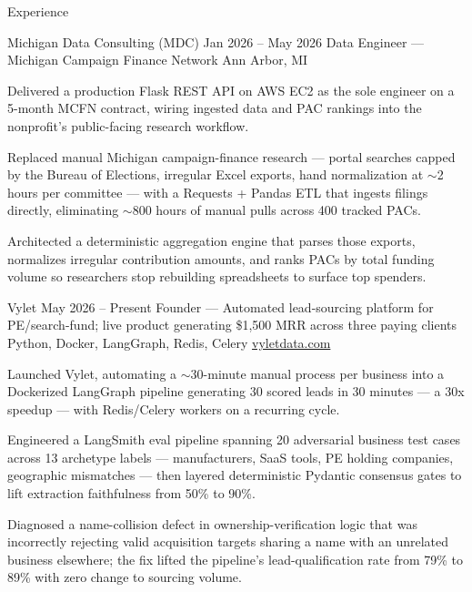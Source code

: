\documentclass[
	11pt
]{../../../template}
\begin{document}
	\begin{rSection}{E}{xperience}
		\begin{rSectionEntry}
			{Michigan Data Consulting (MDC)}
			{Jan 2026 -- May 2026}
			{Data Engineer — Michigan Campaign Finance Network}
			{}
			{Ann Arbor, MI}

			\item Delivered a production Flask REST API on AWS EC2 as the sole engineer on a 5-month MCFN contract, wiring ingested data and PAC rankings into the nonprofit's public-facing research workflow.
			\item Replaced manual Michigan campaign-finance research — portal searches capped by the Bureau of Elections, irregular Excel exports, hand normalization at $\sim$2 hours per committee — with a Requests + Pandas ETL that ingests filings directly, eliminating $\sim$800 hours of manual pulls across 400 tracked PACs.
			\item Architected a deterministic aggregation engine that parses those exports, normalizes irregular contribution amounts, and ranks PACs by total funding volume so researchers stop rebuilding spreadsheets to surface top spenders.
		\end{rSectionEntry}

		\begin{rSectionEntry}
			{Vylet}
			{May 2026 -- Present}
			{Founder --- Automated lead-sourcing platform for PE/search-fund; live product generating \$1,500 MRR across three paying clients}
			{Python, Docker, LangGraph, Redis, Celery}
			{\href{https://vyletdata.com}{vyletdata.com}}

			\item Launched Vylet, automating a $\sim$30-minute manual process per business into a Dockerized LangGraph pipeline generating 30 scored leads in 30 minutes --- a 30x speedup --- with Redis/Celery workers on a recurring cycle.
			\item Engineered a LangSmith eval pipeline spanning 20 adversarial business test cases across 13 archetype labels — manufacturers, SaaS tools, PE holding companies, geographic mismatches — then layered deterministic Pydantic consensus gates to lift extraction faithfulness from 50\% to 90\%.
			\item Diagnosed a name-collision defect in ownership-verification logic that was incorrectly rejecting valid acquisition targets sharing a name with an unrelated business elsewhere; the fix lifted the pipeline's lead-qualification rate from 79\% to 89\% with zero change to sourcing volume.
		\end{rSectionEntry}


\end{rSection}
\end{document}
